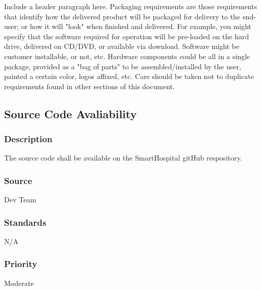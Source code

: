 Include a header paragraph here. Packaging requirements are those requirements that identify how the delivered product will be packaged for delivery to the end-user; or how it will "look" when finished and delivered. For example, you might specify that the software required for operation will be pre-loaded on the hard drive, delivered on CD/DVD, or available via download. Software might be customer installable, or not, etc. Hardware components could be all in a single package, provided as a "bag of parts" to be assembled/installed by the user, painted a certain color, logos affixed, etc. Care should be taken not to duplicate requirements found in other sections of this document.

\subsection{Source Code Avaliability}
\subsubsection{Description}
The source code shall be available on the SmartHospital gitHub respository.
\subsubsection{Source}
Dev Team
\subsubsection{Standards}
N/A
\subsubsection{Priority}
Moderate